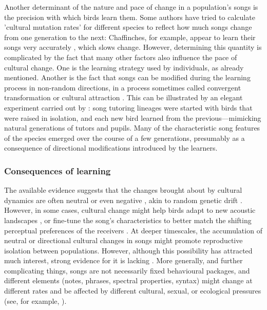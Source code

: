 Another determinant of the nature and pace of change in a population's songs is the precision with which birds learn them. Some authors have tried to calculate 'cultural mutation rates' for different species to reflect how much songs change from one generation to the next: Chaffinches, for example, appear to learn their songs very accurately \autocite{lachlan2003a,Slater1986}, which slows change. However, determining this quantity is complicated by the fact that many other factors also influence the pace of cultural change. One is the learning strategy used by individuals, as already mentioned. Another is the fact that songs can be modified during the learning process in non-random directions, in a process sometimes called convergent transformation or cultural attraction \autocite{claidiere2018,gray2007,heyes1993,morin2016}. This can be illustrated by an elegant experiment carried out by \textcite{feher2009}: song tutoring lineages were started with birds that were raised in isolation, and each new bird learned from the previous---mimicking natural generations of tutors and pupils. Many of the characteristic song features of the species emerged over the course of a few generations, presumably as a consequence of directional modifications introduced by the learners.

\subsubsection{Consequences of learning}
The available evidence suggests that the changes brought about by cultural dynamics are often neutral or even negative \autocite{langin2017,slater2003}, akin to random genetic drift \autocite{Grant2010}. However, in some cases, cultural change might help birds adapt to new acoustic landscapes \autocite{rios-chelen2012,slater2003}, or fine-tune the song's characteristics to better match the shifting perceptual preferences of the receivers \autocite{Renoult2019b}. At deeper timescales, the accumulation of neutral or directional cultural changes in songs might promote reproductive isolation between populations. However, although this possibility has attracted much interest, strong evidence for it is lacking \autocite{freeman2022,Lachlan2004,verzijden2012,Yeh2015}. More generally, and further complicating things, songs are not necessarily fixed behavioural packages, and different elements (notes, phrases, spectral properties, syntax) might change at different rates and be affected by different cultural, sexual, or ecological pressures (see, for example, \cite{williams2013}).

